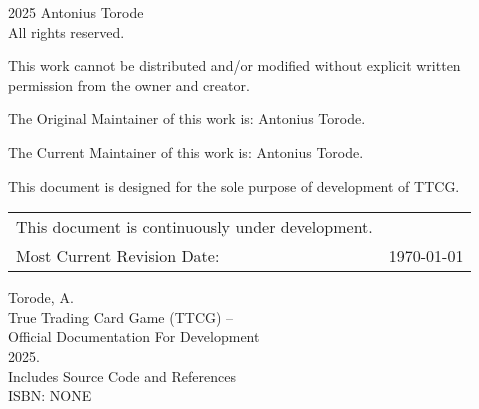 \pagestyle{empty}
\begingroup
\footnotesize
\parindent 0pt
\parskip \baselineskip
\textcopyright{} 2025 Antonius Torode \\
All rights reserved.

This work cannot be distributed and/or modified without explicit written permission from the owner and creator.

The Original Maintainer of this work is: Antonius Torode.

The Current Maintainer of this work is: Antonius Torode.

This document is designed for the sole purpose of development of TTCG.


\begin{center}
\begin{tabular}{ll}
This document is continuously under development. \\
Most Current Revision Date: &  \today 
\end{tabular}
\end{center}

\vfill

Torode, A.\\
\hspace*{2em} True Trading Card Game (TTCG) -- \\
\hspace*{2em} Official Documentation For Development \\
\hspace*{2em} 2025. \\
\hspace*{2em} Includes Source Code and References \\
\hspace*{2em} ISBN: NONE \\



\endgroup
\clearpage